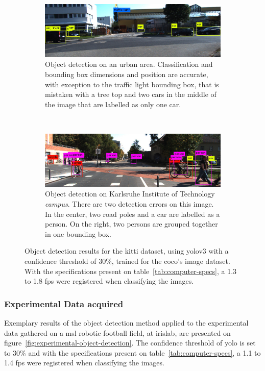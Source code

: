 \begin{figure}[ht!]
	\centering
	\begin{subfigure}[c]{0.8\textwidth}
		\includegraphics[width=\textwidth]{img/object-detection/kitti-4.jpg}
		\caption{Object detection on an urban area. Classification and bounding box dimensions and position are accurate, with exception to the traffic light bounding box, that is mistaken with a tree top and two cars in the middle of the image that are labelled as only one car.}
		\label{fig:kitti-yolo-3}
	\end{subfigure}
	\\ \vspace{4mm}
	\begin{subfigure}[c]{0.8\textwidth}
		\includegraphics[width=\textwidth]{img/object-detection/kitti-2.jpg}
		\caption{Object detection on Karlsruhe Institute of Technology \textit{campus}. There are two detection errors on this image. In the center, two road poles and a car are labelled as a person. On the right, two persons are grouped together in one bounding box.}
		\label{fig:kitti-yolo-2}
	\end{subfigure}
	\caption{Object detection results for the \ac{kitti} dataset, using \ac{yolo}v3 with a confidence threshold of 30\%, trained for the \ac{coco}'s image dataset. With the specifications present on table~\ref{tab:computer-specs}, a 1.3 to 1.8 \ac{fps} were registered when classifying the images.}
	\label{fig:kitti-object-detection}
\end{figure}


\subsubsection{Experimental Data acquired}
Exemplary results of the object detection method applied to the experimental data gathered on a \ac{msl} robotic football field, at \acf{irislab}, are presented on figure~\ref{fig:experimental-object-detection}. The confidence threshold of \ac{yolo} is set to 30\% and with the specifications present on table~\ref{tab:computer-specs}, a 1.1 to 1.4 \ac{fps} were registered when classifying the images.

